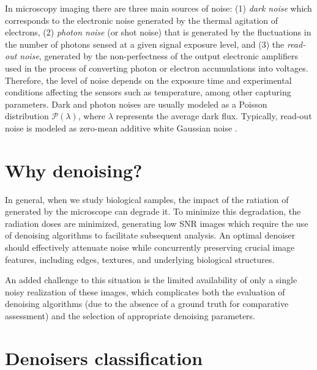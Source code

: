 In microscopy imaging there are three main sources of noise: (1)
\emph{dark noise} which corresponds to the electronic noise generated
by the thermal agitation of electrons, (2) \emph{photon noise} (or
shot noise) that is generated by the fluctuations in the number of
photons sensed at a given signal exposure level, and (3) the
\emph{read-out noise}, generated by the non-perfectness of the output
electronic amplifiers used in the process of converting photon or
electron accumulations into voltages. Therefore, the level of noise
depends on the exposure time and experimental conditions affecting the
sensors such as temperature, among other capturing parameters. Dark
and photon noises are usually modeled as a Poisson distribution
$\mathcal{P}(\lambda)$, where $\lambda$ represents the average dark
flux. Typically, read-out noise is modeled as zero-mean additive white Gaussian
noise \cite{meiniel2018denoising,zhou2020wirtinger}.


\section{Why denoising?}
\label{sec:why_denoising}


In general, when we study biological samples, the impact of the
ratiation of generated by the microscope can degrade it. To minimize
this degradation, the radiation doses are minimized, generating low
\gls{SNR} images which require the use of denoising algorithms to
facilitate subsequent analysis. An optimal denoiser should
effectively attenuate noise while concurrently preserving crucial
image features, including edges, textures, and underlying biological
structures.

An added challenge to this situation is the limited availability of
only a single noisy realization of these images, which complicates
both the evaluation of denoising algorithms (due to the absence of a
ground truth for comparative assessment) and the selection of
appropriate denoising parameters. 


\section{Denoisers classification}

